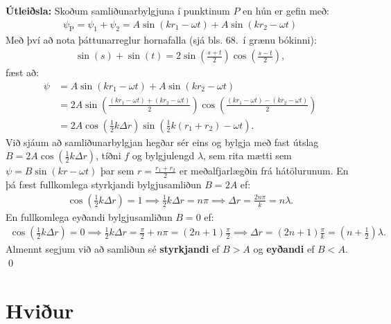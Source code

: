 \textbf{Útleiðsla:} Skoðum samliðunarbylgjuna í punktinum $P$ en hún er gefin með:
\begin{align*}
    \psi_{\text{P}} = \psi_1 + \psi_2 = A \sin(k r_1 - \omega t) +  A \sin(k r_2 - \omega t)
\end{align*}
Með því að nota þáttunarreglur hornafalla (sjá bls. 68.~í grænu bókinni):
\begin{align*}
    \sin(s) + \sin(t) = 2\sin(\frac{s+t}{2})\cos(\frac{s-t}{2}),
\end{align*}
fæst að:
\begin{align*}
    \psi &= A \sin(k r_1 - \omega t) +  A \sin(k r_2 - \omega t) \\
    &= 2A\sin(\frac{\left(kr_1 - \omega t\right) + \left(k r_2 -\omega t\right)}{2})\cos(\frac{\left( k r_1 - \omega t \right) - \left( kr_2 - \omega t \right)}{2}) \\
    &= 2A\cos(\frac{1}{2}k\Delta r)\sin(\frac{1}{2}k(r_1+r_2)-\omega t).
\end{align*}
Við sjáum að samliðunarbylgjan hegðar sér eins og bylgja með fast útslag $B = 2A\cos(\frac{1}{2}k\Delta r)$, tíðni $f$ og bylgjulengd $\lambda$, sem rita mætti sem $\psi = B\sin(kr - \omega t)$ þar sem $r =  \frac{r_1 + r_2}{2}$ er meðalfjarlægðin frá hátölurunum. En þá fæst fullkomlega styrkjandi bylgjusamliðun $B = 2A$ ef:
\begin{align*}
    \cos(\frac{1}{2}k\Delta r) = 1 \implies \frac{1}{2}k\Delta r = n\pi \implies \Delta r = \frac{2n\pi}{k} = n\lambda.
\end{align*}
En fullkomlega eyðandi bylgjusamliðun $B = 0$ ef:
\begin{align*}
    \cos(\frac{1}{2}k\Delta r) = 0 \implies \frac{1}{2}k\Delta r = \frac{\pi}{2} + n\pi = (2n+1)\frac{\pi}{2} \implies \Delta r = (2n +1)\frac{\pi}{k} = \left(n + \frac{1}{2}\right)\lambda.
\end{align*}
Almennt segjum við að samliðun sé \textbf{styrkjandi} ef $B > A$ og \textbf{eyðandi} ef $B < A$. \qed


\section{Hviður}


